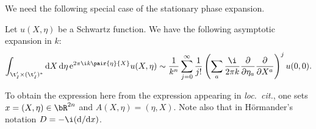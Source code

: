 We need the following special case of the stationary phase expansion.
\begin{Proposition}
Let $u(X,\eta)$ be a Schwartz function. We have the following asymptotic expansion in $k$:
\[ \int_{\t_I^\prime \times (\t_I^\prime)^\ast}{\rm d}X\, {\rm d}\eta\, {\rm e}^{2\pi \i k\pair{\eta}{X}}u(X,\eta)\sim \frac{1}{k^n}\sum_{j=0}^\infty \frac{1}{j!} \left(\sum_a \frac{\i}{2\pi k}\frac{\partial}{\partial \eta_a}\frac{\partial}{\partial X^a}\right)^j u(0,0).\]
\end{Proposition}
\begin{Remark}
To obtain the expression here from the expression appearing in \emph{loc.\ cit.}, one sets $x=(X,\eta) \in \bR^{2n}$ and $A(X,\eta)=(\eta,X)$. Note also that in H{\"o}rmander's notation $D=-\i({\rm d}/{\rm d}x)$.
\end{Remark}

